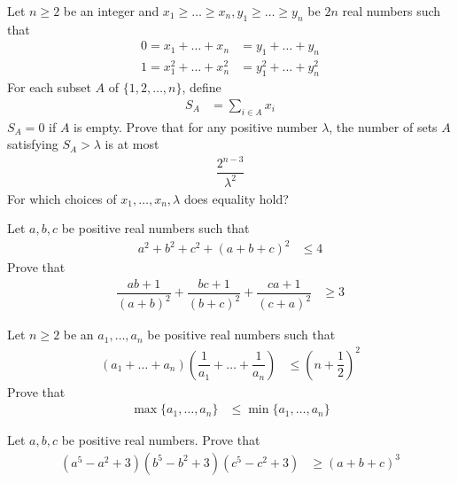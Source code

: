 \documentclass{subfile}
\begin{document}
		\begin{problem}
			Let $n\geq2$ be an integer and $x_{1}\geq\ldots\geq x_{n},y_{1}\geq\ldots\geq y_{n}$ be $2n$ real numbers such that
				\begin{align*}
					0 = x_{1}+\ldots+x_{n}
						& = y_{1}+\ldots+y_{n}\\
					1 = x_{1}^{2}+\ldots+x_{n}^{2}
						& = y_{1}^{2}+\ldots+y_{n}^{2}
				\end{align*}
			For each subset $A$ of $\{1,2,\ldots,n\}$, define
				\begin{align*}
					S_{A}
						& = \sum_{i\in A}x_{i}
				\end{align*}
			$S_{A}=0$ if $A$ is empty. Prove that for any positive number $\lambda$, the number of sets $A$ satisfying $S_{A}>\lambda$ is at most
				\begin{align*}
					\dfrac{2^{n-3}}{\lambda^{2}}
				\end{align*}
			For which choices of $x_{1},\ldots,x_{n},\lambda$ does equality hold?
		\end{problem}
	
		\begin{problem}
			Let $a,b,c$ be positive real numbers such that
				\begin{align*}
					a^{2}+b^{2}+c^{2}+(a+b+c)^{2}
						& \leq 4
				\end{align*}
			Prove that
				\begin{align*}
					\dfrac{ab+1}{(a+b)^{2}}+\dfrac{bc+1}{(b+c)^{2}}+\dfrac{ca+1}{(c+a)^{2}}
						& \geq3
				\end{align*}
		\end{problem}
	
		\begin{problem}
			Let $n\geq2$ be an $a_{1},\ldots,a_{n}$ be positive real numbers such that
				\begin{align*}
					(a_{1}+\ldots+a_{n})\left(\dfrac{1}{a_{1}}+\ldots+\dfrac{1}{a_{n}}\right)
						& \leq \left(n+\dfrac{1}{2}\right)^{2}
				\end{align*}
			Prove that
				\begin{align*}
					\max\{a_{1},\ldots,a_{n}\}
						& \leq\min\{a_{1},\ldots,a_{n}\}
				\end{align*}
		\end{problem}
	
		\begin{problem}
			Let $a,b,c$ be positive real numbers. Prove that
				\begin{align*}
					(a^{5}-a^{2}+3)(b^{5}-b^{2}+3)(c^{5}-c^{2}+3)
						& \geq (a+b+c)^{3}
				\end{align*}
		\end{problem}
	
\end{document}
